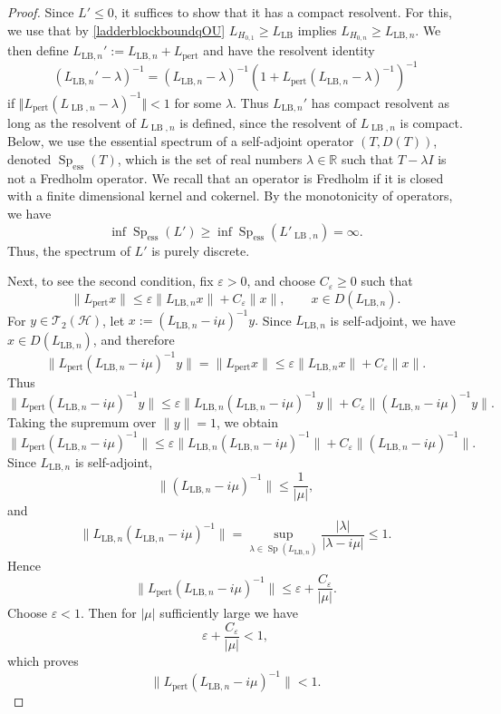 \documentclass[11pt]{amsart}
\newcommand{\1}{\mathbbm{1}}
\newcommand{\spec}{\operatorname{Sp}}
\theoremstyle{plain}
\theoremstyle{definition}
\theoremstyle{remark}
\numberwithin{equation}{section}
\begin{document}
\begin{proof}
Since $L'\le 0$, it suffices to show that it has a compact resolvent. 
For this, we use that by \eqref{ladderblockboundqOU} $L_{H_{0,1}} \ge L_{\text{LB}}$ implies $L_{H_{0,n}}\ge L_{\text{LB},n}$. We then define $L_{\text{LB},n}':=L_{\text{LB},n} + L_{\text{pert}}$ and have the resolvent identity
\[
 (L_{\text{LB},n}'-\lambda)^{-1}
 =(L_{\text{LB},n}-\lambda )^{-1}
 (1 +L_{\operatorname{pert}} (L_{\text{LB},n}-\lambda )^{-1} )^{-1}
\]
if $\Vert L_{\operatorname{pert}} (L_{\operatorname{LB},n}-\lambda )^{-1} \Vert <1$ for some $\lambda.$ Thus $L_{\text{LB},n}'$ has compact resolvent as long as the resolvent of $L_{\operatorname{LB},n}$ is defined, since the resolvent of $L_{\operatorname{LB},n}$ is compact.
Below, we use the essential spectrum of a self-adjoint operator $(T,D(T))$, denoted $\operatorname{Sp}_{\text{ess}}(T)$, which is the set of real numbers $\lambda\in\mathbb{R}$ such that $T-\lambda I$ is not a Fredholm operator. We recall that an operator is Fredholm if it is closed with a finite dimensional kernel and cokernel. By the monotonicity of operators, we have
\[
\inf \operatorname{Sp}_{\text{ess}}(L')
\ge
\inf \operatorname{Sp}_{\text{ess}}(L'_{\operatorname{LB},n})=\infty.
\]
Thus, the spectrum of $L'$ is purely discrete. 






Next, to see the second condition, fix $\varepsilon>0$, and choose $C_\varepsilon\ge0$ such that
\[
\|L_{\mathrm{pert}}x\|
\le
\varepsilon \|L_{\mathrm{LB},n}x\|+C_\varepsilon \|x\|,
\qquad x\in D(L_{\mathrm{LB},n}).
\]
For $y\in \mathscr T_2(\mathcal H)$, let $x:=(L_{\mathrm{LB},n}-i\mu)^{-1}y.$
Since $L_{\mathrm{LB},n}$ is self-adjoint, we have $x\in D(L_{\mathrm{LB},n})$, and therefore
\[
\|L_{\mathrm{pert}}(L_{\mathrm{LB},n}-i\mu)^{-1}y\|
=
\|L_{\mathrm{pert}}x\|
\le
\varepsilon \|L_{\mathrm{LB},n}x\|+C_\varepsilon \|x\|.
\]
Thus
\[
\|L_{\mathrm{pert}}(L_{\mathrm{LB},n}-i\mu)^{-1}y\|
\le
\varepsilon \|L_{\mathrm{LB},n}(L_{\mathrm{LB},n}-i\mu)^{-1}y\|
+
C_\varepsilon \|(L_{\mathrm{LB},n}-i\mu)^{-1}y\|.
\]
Taking the supremum over $\|y\|=1$, we obtain
\[
\|L_{\mathrm{pert}}(L_{\mathrm{LB},n}-i\mu)^{-1}\|
\le
\varepsilon \|L_{\mathrm{LB},n}(L_{\mathrm{LB},n}-i\mu)^{-1}\|
+
C_\varepsilon \|(L_{\mathrm{LB},n}-i\mu)^{-1}\|.
\]
Since $L_{\mathrm{LB},n}$ is self-adjoint,
\[
\|(L_{\mathrm{LB},n}-i\mu)^{-1}\|\le \frac1{|\mu|},
\]
and
\[
\|L_{\mathrm{LB},n}(L_{\mathrm{LB},n}-i\mu)^{-1}\|
=
\sup_{\lambda\in\spec(L_{\mathrm{LB},n})}\frac{|\lambda|}{|\lambda-i\mu|}
\le 1.
\]
Hence
\[
\|L_{\mathrm{pert}}(L_{\mathrm{LB},n}-i\mu)^{-1}\|
\le
\varepsilon+\frac{C_\varepsilon}{|\mu|}.
\]
Choose $\varepsilon<1$. Then for $|\mu|$ sufficiently large we have
\[
\varepsilon+\frac{C_\varepsilon}{|\mu|}<1,
\]
which proves
\[
\|L_{\mathrm{pert}}(L_{\mathrm{LB},n}-i\mu)^{-1}\|<1.
\]
\end{proof}
\end{document}
